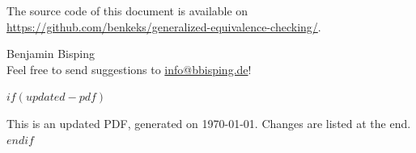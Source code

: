 \vspace{0.5cm}

\noindent
The source code of this document is available on\\
\url{https://github.com/benkeks/generalized-equivalence-checking/}.

\vspace{0.5cm}

\noindent
Benjamin Bisping \\
Feel free to send suggestions to \href{mailto:info@bbisping.de}{info@bbisping.de}!

$if(updated-pdf)$
\vspace{0.5cm}

\noindent
This is an updated PDF, generated on \today. Changes are listed at the end.
$endif$

\clearpage

%

\let\mainmatterforreal=\mainmatter
\renewcommand{\mainmatter}{}